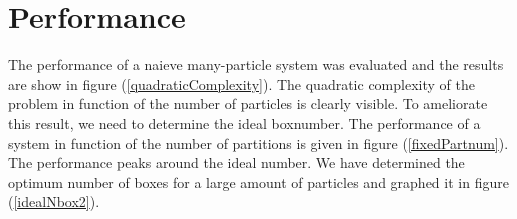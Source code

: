 \section{Performance}

The performance of a naieve many-particle system was evaluated and the results 
are show in figure (\ref{quadraticComplexity}). The quadratic complexity of the 
problem in function of the number of particles is clearly visible. To 
ameliorate this result, we need to determine the ideal boxnumber. The 
performance of a system in function of the number of partitions is given in 
figure (\ref{fixedPartnum}). The performance peaks around the ideal number. We 
have determined the optimum number of boxes for a large amount of particles and 
graphed it in figure (\ref{idealNbox2}).


